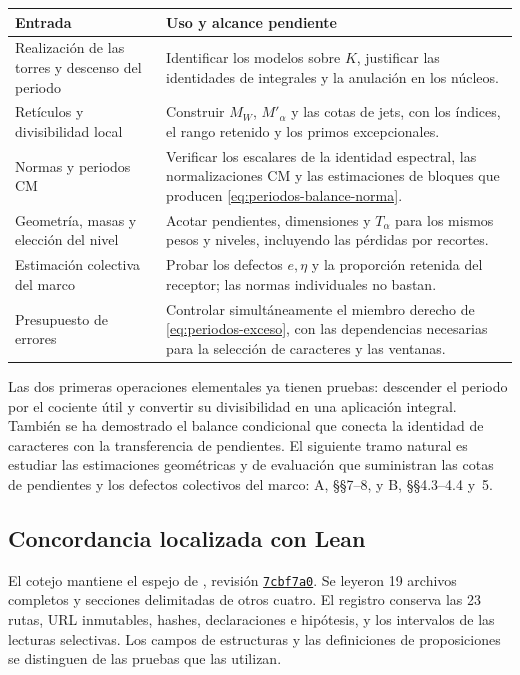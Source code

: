 \begin{center}
\small
\begin{tabularx}{\textwidth}{@{}>{\raggedright\arraybackslash}p{}Y@{}}
\toprule
Entrada & Uso y alcance pendiente \\
\midrule
Realización de las torres y descenso del periodo &
Identificar los modelos sobre $K$, justificar las identidades de
integrales y la anulación en los núcleos. \\
Retículos y divisibilidad local &
Construir $M_W$, $M'_\alpha$ y las cotas de jets, con los índices,
el rango retenido y los primos excepcionales. \\
Normas y periodos CM &
Verificar los escalares de la identidad espectral, las normalizaciones
CM y las estimaciones de bloques que producen
\eqref{eq:periodos-balance-norma}. \\
Geometría, masas y elección del nivel &
Acotar pendientes, dimensiones y $T_\alpha$ para los mismos pesos
y niveles, incluyendo las pérdidas por recortes. \\
Estimación colectiva del marco &
Probar los defectos $e,\eta$ y la proporción retenida del receptor;
las normas individuales no bastan. \\
Presupuesto de errores &
Controlar simultáneamente el miembro derecho de
\eqref{eq:periodos-exceso}, con las dependencias necesarias para
la selección de caracteres y las ventanas. \\
\bottomrule
\end{tabularx}
\end{center}

Las dos primeras operaciones elementales ya tienen pruebas:
descender el periodo por el cociente útil y convertir su divisibilidad
en una aplicación integral. También se ha demostrado el balance
condicional que conecta la identidad de caracteres con la transferencia
de pendientes. El siguiente tramo natural es estudiar las estimaciones
geométricas y de evaluación que suministran las cotas de pendientes y
los defectos colectivos del marco: A, §§7--8, y B, §§4.3--4.4 y~5.

\subsection{Concordancia localizada con Lean}
\label{subsec:periodos-lean}

El cotejo mantiene el espejo de \cite{lean}, revisión
\href{https://github.com/CocoSgt/riemann-hypothesis-lean/tree/7cbf7a0c32fca1badf05931879a37c3f8a2b03b4}{\texttt{7cbf7a0}}.
Se leyeron 19 archivos completos y secciones delimitadas de otros
cuatro. El registro conserva las 23 rutas, URL inmutables, hashes,
declaraciones e hipótesis, y los intervalos de las lecturas selectivas.
Los campos de estructuras y las definiciones de proposiciones se
distinguen de las pruebas que las utilizan.

